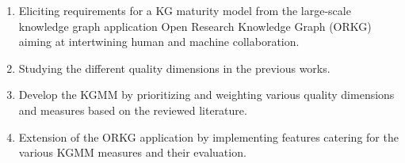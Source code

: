 \documentclass[runningheads]{llncs}
\begin{document}
\begin{enumerate}
\begin{table}[t]
{\begin{tabular}{|p{3.8cm}|c|p{3cm}|c|p{2.5cm}|}
    \end{tabular}%
}
\end{table}
    \item Eliciting requirements for a KG maturity model from the large-scale knowledge graph application Open Research Knowledge Graph (ORKG) aiming at intertwining human and machine collaboration.
    \item Studying the different quality dimensions in the previous works.
    \item Develop the KGMM by prioritizing and weighting various quality dimensions and measures based on the reviewed literature.
    \item Extension of the ORKG application by implementing features catering for the various KGMM measures and their evaluation. 
    
\end{enumerate}
\end{document}
